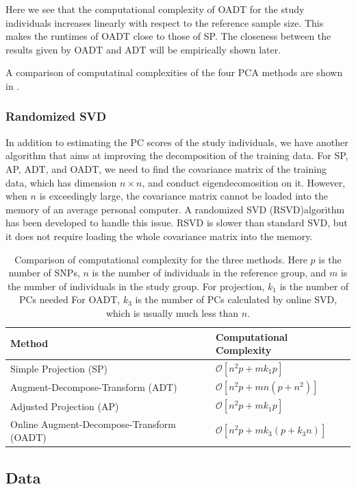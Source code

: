 \documentclass{article}
\newcommand{\bO}{\mathcal{O}}
\begin{document}
Here we see that the computational complexity of OADT for the study individuals increases linearly with respect to the reference sample size.
This makes the runtimes of OADT close to those of SP.
The closeness between the results given by OADT and ADT will be empirically shown later.

A comparison of computatinal complexities of the four PCA methods are shown in .

\subsubsection{Randomized SVD}
In addition to estimating the PC scores of the study individuals,
we have another algorithm that aims at improving the decomposition of the
training data.
For SP, AP, ADT, and OADT, we need to find the covariance matrix of the training
data, which has dimension $n \times n$, and conduct eigendecomosition on it.
However, when $n$ is exceedingly large,
the covariance matrix cannot be loaded into the memory of an average personal
computer.
A randomized SVD (RSVD)algorithm has been developed to handle this issue.
RSVD is slower than standard SVD,
but it does not require loading the whole covariance matrix into the memory.


\begin{table} 
  \centering
  \begin{tabular}{|l|l|}
    \hline
    Method & Computational Complexity \\ 
    \hline
    Simple Projection (SP) & $\bO[n^2p + mk_1p]$ \\
    \hline
    Augment-Decompose-Transform (ADT) & $\bO[n^2 p + mn(p + n^2)]$ \\
    \hline
    Adjusted Projection (AP) & $\bO[n^2p + mk_1p]$ \\
    \hline
    Online Augment-Decompose-Transform (OADT) & $\bO[n^2 p + mk_3(p + k_3 n)]$ \\
    \hline
  \end{tabular}
  \caption{
    Comparison of computational complexity for the three methods.
    Here $p$ is the number of SNPs,
    $n$ is the number of individuals in the reference group,
    and $m$ is the number of individuals in the  study group.
    For projection, $k_1$ is the number of PCs needed
    For OADT, $k_3$ is the number of PCs calculated by online SVD, which is usually much less than $n$.}
  \label{tbl:cplx}
\end{table}

\subsection{Data}
\end{document}
